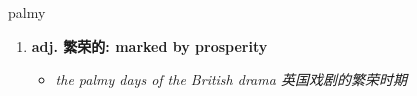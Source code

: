 
\begin{frame}
{\huge palmy}
\begin{center}
\begin{enumerate}\Large
  \item \textbf{adj. 繁荣的: marked by prosperity}
  \begin{itemize}
    \item \em{\Large{the palmy days of the British drama 英国戏剧的繁荣时期}}
  \end{itemize}
\end{enumerate}
\end{center}
\end{frame}
